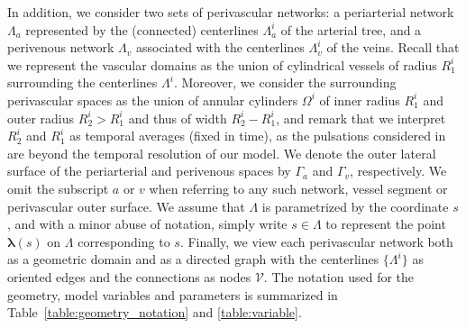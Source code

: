 \documentclass[fleqn,10pt]{wlscirep}
\begin{document}
In addition, we consider two sets of perivascular networks: a
periarterial network $\Lambda_a$ represented by the (connected)
centerlines $\Lambda^i_{a}$ of the arterial tree, and a perivenous
network $\Lambda_v$ associated with the centerlines $\Lambda^i_{v}$ of
the veins. Recall that we represent the vascular domains as the union
of cylindrical vessels of radius $R_1^i$ surrounding the centerlines
$\Lambda^i$. Moreover, we consider the surrounding perivascular spaces
as the union of annular cylinders $\Omega^i$ of inner radius $R_1^i$
and outer radius $R_2^i > R_1^i$ and thus of width $R_2^i - R_1^i$,
and remark that we interpret $R^i_2$ and $R^i_1$ as temporal averages
(fixed in time), as the pulsations considered in
 are beyond the temporal resolution of our
model. We denote the outer lateral surface of the periarterial and
perivenous spaces by $\Gamma_a$ and $\Gamma_v$, respectively. We omit
the subscript $a$ or $v$ when referring to any such network, vessel
segment or perivascular outer surface. We assume that $\Lambda$ is
parametrized by the coordinate $s$, and with a minor abuse of
notation, simply write $s \in \Lambda$ to represent the point ${\bm
  \lambda}(s)$ on $\Lambda$ corresponding to $s$. Finally, we view
each perivascular network both as a geometric domain and as a directed
graph with the centerlines $\{ \Lambda^i \}$ as oriented edges and the
connections as nodes $\mathcal{V}$. The notation used for the
geometry, model variables and parameters is summarized in
Table~\ref{table:geometry_notation} and \ref{table:variable}.
\end{document}
